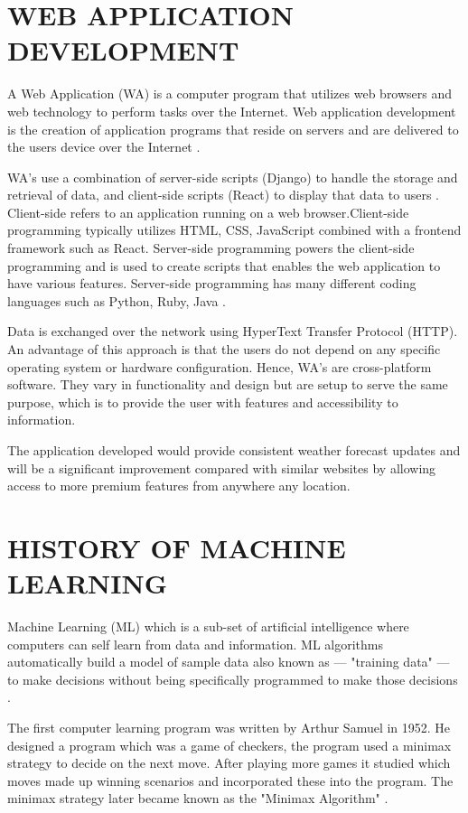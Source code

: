 \section{WEB APPLICATION DEVELOPMENT}
A Web Application (WA) is a computer program that utilizes web browsers and web technology to perform tasks over the Internet. Web application development is the creation of application programs that reside on servers and are delivered to the users device over the Internet \cite{WebAppDef}.

WA's use a combination of server-side scripts (Django) to handle the storage and retrieval of data, and client-side scripts (React) to display that data to users \cite{WebApp}. Client-side refers to an application running on a web browser.Client-side programming typically utilizes HTML, CSS, JavaScript combined with a frontend framework such as React. Server-side programming powers the client-side programming and is used to create scripts that enables the web application to have various features. Server-side programming has many different coding languages such as Python, Ruby, Java \cite{WebAppDef}.

Data is exchanged over the network using HyperText Transfer Protocol (HTTP). An advantage of this approach is that the users do not depend on any specific operating system or hardware configuration. Hence, WA's are cross-platform software. They vary in functionality and design but are setup to serve the same purpose, which is to provide the user with features and accessibility to information.

The application developed would provide consistent weather forecast updates and will be a significant improvement compared with similar websites by allowing access to more premium features from anywhere any location. 

\section{HISTORY OF MACHINE LEARNING}
Machine Learning (ML) which is a sub-set of artificial intelligence where computers can self learn from data and information. ML algorithms automatically build a model of sample data also known as — "training data" — to make decisions without being specifically programmed to make those decisions \cite{MLAlgorithms}.

The first computer learning program was written by Arthur Samuel in 1952. He designed a program which was a game of checkers, the program used a minimax strategy to decide on the next move. After playing more games it studied which moves made up winning scenarios and incorporated these into the program. The minimax strategy later became known as the "Minimax Algorithm" \cite{MiniMax}.

